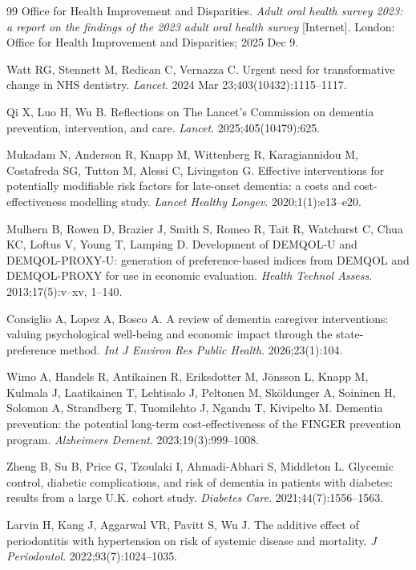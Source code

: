 \documentclass[11pt,a4paper]{article}
\begin{document}
\begin{thebibliography}{99}
 Office for Health Improvement and Disparities. \textit{Adult oral health survey 2023: a report on the findings of the 2023 adult oral health survey} [Internet]. London: Office for Health Improvement and Disparities; 2025 Dec 9.

 Watt RG, Stennett M, Redican C, Vernazza C. Urgent need for transformative change in NHS dentistry. \textit{Lancet}. 2024 Mar 23;403(10432):1115--1117.

 Qi X, Luo H, Wu B. Reflections on The Lancet's Commission on dementia prevention, intervention, and care. \textit{Lancet}. 2025;405(10479):625.

 Mukadam N, Anderson R, Knapp M, Wittenberg R, Karagiannidou M, Costafreda SG, Tutton M, Alessi C, Livingston G. Effective interventions for potentially modifiable risk factors for late-onset dementia: a costs and cost-effectiveness modelling study. \textit{Lancet Healthy Longev}. 2020;1(1):e13--e20.

 Mulhern B, Rowen D, Brazier J, Smith S, Romeo R, Tait R, Watchurst C, Chua KC, Loftus V, Young T, Lamping D. Development of DEMQOL-U and DEMQOL-PROXY-U: generation of preference-based indices from DEMQOL and DEMQOL-PROXY for use in economic evaluation. \textit{Health Technol Assess}. 2013;17(5):v--xv, 1--140.

 Consiglio A, Lopez A, Bosco A. A review of dementia caregiver interventions: valuing psychological well-being and economic impact through the state-preference method. \textit{Int J Environ Res Public Health}. 2026;23(1):104.

 Wimo A, Handels R, Antikainen R, Eriksdotter M, Jönsson L, Knapp M, Kulmala J, Laatikainen T, Lehtisalo J, Peltonen M, Sköldunger A, Soininen H, Solomon A, Strandberg T, Tuomilehto J, Ngandu T, Kivipelto M. Dementia prevention: the potential long-term cost-effectiveness of the FINGER prevention program. \textit{Alzheimers Dement}. 2023;19(3):999--1008.

 Zheng B, Su B, Price G, Tzoulaki I, Ahmadi-Abhari S, Middleton L. Glycemic control, diabetic complications, and risk of dementia in patients with diabetes: results from a large U.K. cohort study. \textit{Diabetes Care}. 2021;44(7):1556--1563.

 Larvin H, Kang J, Aggarwal VR, Pavitt S, Wu J. The additive effect of periodontitis with hypertension on risk of systemic disease and mortality. \textit{J Periodontol}. 2022;93(7):1024--1035.

\end{thebibliography}
\end{document}
